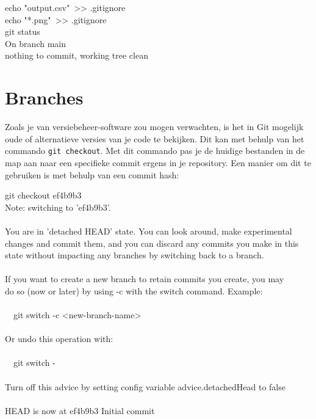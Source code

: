 \begin{bash}
 echo "\mbox{}output.csv"\ >\!> .gitignore \\
 echo "*.png"\ >\!> .gitignore \\
 git status\\
On branch main\\
nothing to commit, working tree clean\\
\end{bash}

\section{Branches} \label{sec:branches}
Zoals je van versiebeheer-software zou mogen verwachten, is het in Git mogelijk oude of alternatieve versies van je code te bekijken. Dit kan met behulp van het commando \texttt{git checkout}. Met dit commando pas je de huidige bestanden in de map aan naar een specifieke commit ergens in je repository. Een manier om dit te gebruiken is met behulp van een commit hash:

\begin{bash}
 git checkout ef4b9b3\\
Note: switching to 'ef4b9b3'.\\
~ \\
You are in 'detached HEAD' state. You can look around, make experimental\\
changes and commit them, and you can discard any commits you make in this\\
state without impacting any branches by switching back to a branch.\\
~ \\
If you want to create a new branch to retain commits you create, you may\\
do so (now or later) by using -c with the switch command. Example:\\
~ \\
\ \ git switch -c <new-branch-name>\\
~ \\
Or undo this operation with:\\
~ \\
\ \ git switch -\\
~ \\
Turn off this advice by setting config variable advice.detachedHead to false\\
~ \\
HEAD is now at ef4b9b3 Initial commit
\end{bash}

